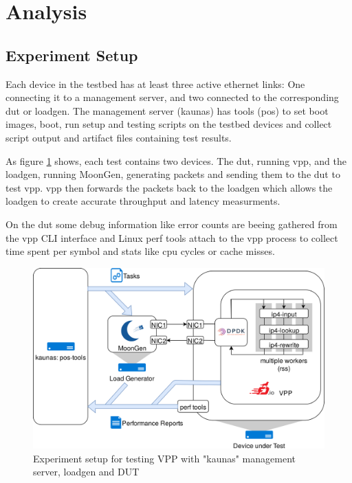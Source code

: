 
\section{Analysis}


\subsection{Experiment Setup}

Each device in the testbed has at least three active ethernet links:
One connecting it to a management server, and two connected to the
corresponding \Ac{dut} or \Ac{loadgen}. The management server (kaunas)
has tools (pos) to set boot images, boot, run setup and testing
scripts on the testbed devices and collect script output and artifact
files containing test results.

As figure \ref{setup} shows, each test contains two devices. The
\Ac{dut}, running \Ac{vpp}, and the \Ac{loadgen}, running MoonGen,
generating packets and sending them to the \Ac{dut} to test \Ac{vpp}.
\Ac{vpp} then forwards the packets back to the \Ac{loadgen} which
allows the \Ac{loadgen} to create accurate throughput and latency
measurments.

On the \Ac{dut} some debug information like error counts are beeing
gathered from the \Ac{vpp} CLI interface and Linux perf tools
\cite{perf} attach to the vpp process to collect time spent per symbol
and stats like cpu cycles or cache misses.

\begin{figure}[!ht]
\noindent\hspace{0.5mm}\includegraphics[width=\linewidth]{pics/topology.png}
\caption{Experiment setup for testing VPP with "kaunas" management server, \Ac{loadgen} and DUT}
\label{setup}
\end{figure}


